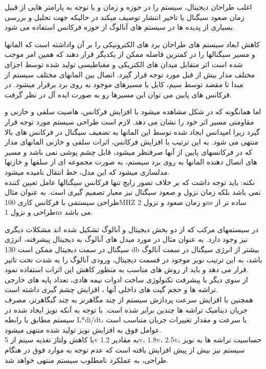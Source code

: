 اغلب طراحان دیجیتال، سیستم را در حوزه و زمان و با توجه به پارامتر هایی از قبیل زمان صعود سیگنال یا تاخیر انتشار توصیف میکند در حالیکه جهت تحلیل و بررسی بسیاری از پدیده ها در سیستم های آنالوگ از حوزه فرکانس استفاده می شود.

کاهش ابعاد سیستم های طراحان برد های الکترونیکی را بر آن واداشته است که المانها و مسیر سیگنالها را در کمترین فاصله ممکن از یکدیگر قرار دهند که همین امر موجب شده است اثر متقابل میدان های الکتریکی و مغناطیسی تولید شده توسط اجزای مختلف مدار بیش از قبل مورد توجه قرار گیرد. اتصال بین المانهای مختلف سیستم از مبدا تا مقصد توسط سیم، کابل یا مسیرهای موجود به روی برد برقرار میشود. در فرکانس های پایین می توان این مسیرها رو به صورت ایده آل در نظر گرفت.

اما همانگونه که در شکل مشاهده میشود با افزایش فرکانس، هاصیت سلفی و خازنی و مقاومتی مسیر اثر خود را نشان می دهد. لازم است طراحی سیستم مورد توجه قرار گیرد زیرا امپدانس ایجاد شده توسط این المانها به تضعیف سیگنال در فرکانس های بالا منتهی می شود.
به این ترتیب با افزایش فرکانس، اثرات سلفی و خازنی المانهای مدار که در فرکانسهای پایین از آنها صرفنظر میشود، قابل چشم پوشی نمی باشد و مسیر های اتصال دهنده المانها به روی برد سیستم، به صورت مجموعه ای از سلفها و خازنها مدلسازی میشود که این مدل، خط انتقال نامیده میشود.\\
نکته: باید توجه داشت که بر خلاف تصور رایج تنها فرکانس سیگنالها عامل تعیین کننده نمی باشد بلکه زمان نزول و صعود سیگنال نیز معیار تصمیم گیری است. به عنوان مثال طراحی سیستمی با فرکانس کاری 100MHZ و زمان صعود و نزول 2ns ساده تر از طراحی و نزول 1ns می باشد.

در سیستمهای مرکب که از دو بخش دیجیتال و آنالوگ تشکیل شده اند مشکلات دیگری نیز وجود دارد. به عنوان مثال در مورد مبدل های آنالوگ به دیجیتال پیشرفته، انرژی سیگنال در سمت دیجیتال ممکن است 130 db بیشتر از انرژی سیگنال در سمت آنالوگ باشد، به این ترتیب نویز موجود در قسمت دیجیتال، ورودی آنالوگ را به شدت تحت تاثیر قرار می دهد و باید از روش های مناسب به منظور کاهش این اثرات استفاده نمود.\\
از سوی دیگر با پیشرفت تکنولوژی ساخت ادوات نیمه هادی، تعداد پایه های خارجی تراشه ها و حجم گیت های داخلی آنها ، اقزایش چشم گیری داشته است.\\
همچنین با اقزایش سرعت پردازش سیستم از چند مگاهرتز به چند گیگاهرتز، مصرف جریان دینامیک تراشه ها چندین برابر شده است. با توجه به آنکه نویز ایجاد شده در سیستم مطابق با رابطه L*di/dt، با سرعت و مقدار تغییرات جریان متناسب است عوامل فوق به افزایش نویز تولید شده منتهی میشود.\\
با کاهش ولتاژ تغذیه سیتم از 5v به مقادیر 1.2v، 1.8v، 2.5v، حساسیت تراشه ها به نویز سیستم نیز بیش از پیش افزایش یافته است که عدم توجه به موارد فوق در هنگام طراحی، به عملکرد نامطلوب سیستم منتهی خواهد شد.

